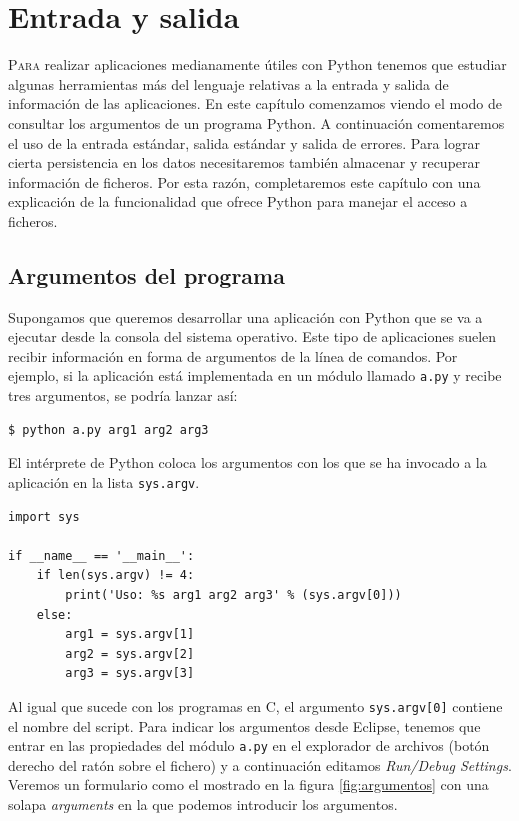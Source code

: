 
\chapter{Entrada y salida}

\lettrine[lines=5]{P}{ara} realizar aplicaciones medianamente útiles con Python tenemos que estudiar algunas herramientas más del lenguaje relativas a la entrada y salida de información de las aplicaciones. En este capítulo comenzamos viendo el modo de consultar los argumentos de un programa Python. A continuación comentaremos el uso de la entrada estándar, salida estándar y salida de errores. Para lograr cierta persistencia en los datos necesitaremos también almacenar y recuperar información de ficheros. Por esta razón, completaremos este capítulo con una explicación de la funcionalidad que ofrece Python para manejar el acceso a ficheros.

\section{Argumentos del programa}

Supongamos que queremos desarrollar una aplicación con Python que se va a ejecutar desde la consola del sistema operativo. Este tipo de aplicaciones suelen recibir información en forma de argumentos de la línea de comandos. Por ejemplo, si la aplicación está implementada en un módulo llamado \texttt{a.py} y recibe tres argumentos, se podría lanzar así:

\begin{lstlisting}
$ python a.py arg1 arg2 arg3
\end{lstlisting}

El intérprete de Python coloca los argumentos con los que se ha invocado a la aplicación en la lista \texttt{sys.argv}. 

\begin{lstlisting}
import sys

if __name__ == '__main__':
    if len(sys.argv) != 4:
        print('Uso: %s arg1 arg2 arg3' % (sys.argv[0]))
    else:
        arg1 = sys.argv[1]
        arg2 = sys.argv[2]
        arg3 = sys.argv[3]
\end{lstlisting}

Al igual que sucede con los programas en C, el argumento \texttt{sys.argv[0]} contiene el nombre del script. Para indicar los argumentos desde Eclipse, tenemos que entrar en las propiedades del módulo \texttt{a.py} en el explorador de archivos (botón derecho del ratón sobre el fichero) y a continuación editamos \emph{Run/Debug Settings}. Veremos un formulario como el mostrado en la figura \ref{fig:argumentos} con una solapa \emph{arguments} en la que podemos introducir los argumentos.

